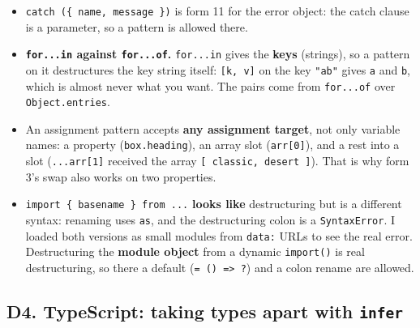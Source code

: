 \documentclass[
  10pt,
]{article}
\providecommand{\tightlist}{%
  \setlength{\itemsep}{0pt}\setlength{\parskip}{0pt}}
\begin{document}
\begin{itemize}
\tightlist
\item
  \texttt{catch\ (\{\ name,\ message\ \})} is form 11 for the error
  object: the catch clause is a parameter, so a pattern is allowed
  there.
\item
  \textbf{\texttt{for.\allowbreak{}.\allowbreak{}.\allowbreak{}in}
  against \texttt{for.\allowbreak{}.\allowbreak{}.\allowbreak{}of}.}
  \texttt{for.\allowbreak{}.\allowbreak{}.\allowbreak{}in} gives the
  \textbf{keys} (strings), so a pattern on it destructures the key
  string itself: \texttt{{[}k,\ v{]\allowbreak{}}} on the key
  \texttt{"ab"} gives \texttt{a} and \texttt{b}, which is almost never
  what you want. The pairs come from
  \texttt{for.\allowbreak{}.\allowbreak{}.\allowbreak{}of} over
  \texttt{Object.\allowbreak{}entries}.
\item
  An assignment pattern accepts \textbf{any assignment target}, not only
  variable names: a property (\texttt{box.\allowbreak{}heading}), an
  array slot (\texttt{arr{[}0{]\allowbreak{}}}), and a rest into a slot
  (\texttt{.\allowbreak{}.\allowbreak{}.\allowbreak{}arr{[}1{]\allowbreak{}}}
  received the array
  \texttt{{[}\ \allowbreak{}\textquotesingle{}classic\allowbreak{}\textquotesingle{},\ \allowbreak{}\textquotesingle{}desert\allowbreak{}\textquotesingle{}\ {]\allowbreak{}}}).
  That is why form 3's swap also works on two properties.
\item
  \texttt{import\ \{\ basename\ \}\ from\ .\allowbreak{}.\allowbreak{}.\allowbreak{}}
  \textbf{looks like} destructuring but is a different syntax: renaming
  uses \texttt{as}, and the destructuring colon is a
  \texttt{SyntaxError}. I loaded both versions as small modules from
  \texttt{data:} URLs to see the real error. Destructuring the
  \textbf{module object} from a dynamic \texttt{import()} is real
  destructuring, so there a default
  (\texttt{=\ ()\ =\textgreater{}\allowbreak{}\ \allowbreak{}\textquotesingle{}?\allowbreak{}\textquotesingle{}})
  and a colon rename are allowed.
\end{itemize}

\hypertarget{d4-typescript-taking-types-apart-with-infer}{%
\subsection{\texorpdfstring{D4. TypeScript: taking types apart with
\texttt{infer}}{D4. TypeScript: taking types apart with }}\label{d4-typescript-taking-types-apart-with-infer}}
\end{document}
